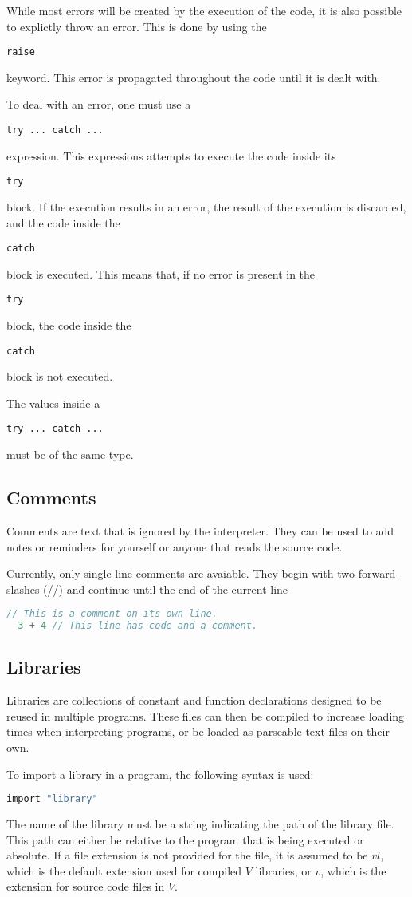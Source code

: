 \documentclass{article}
\def\code#1{\begin{footnotesize}\texttt{#1}\end{footnotesize}}
\begin{document}
While most errors will be created by the execution of the code, it is also possible to explictly throw an error.
This is done by using the \code{raise} keyword.
This error is propagated throughout the code until it is dealt with.

To deal with an error, one must use a \code{try ... catch ...} expression.
This expressions attempts to execute the code inside its \code{try} block.
If the execution results in an error, the result of the execution is discarded, and the code inside the \code{catch} block is executed.
This means that, if no error is present in the \code{try} block, the code inside the \code{catch} block is not executed.

The values inside a \code{try ... catch ...} must be of the same type.

\subsection{Comments}
Comments are text that is ignored by the interpreter.
They can be used to add notes or reminders for yourself or anyone that reads the source code.

Currently, only single line comments are avaiable.
They begin with two forward-slashes (//) and continue until the end of the current line

\begin{lstlisting}[language=V]
  // This is a comment on its own line.
  3 + 4 // This line has code and a comment.
\end{lstlisting}

\subsection{Libraries}

Libraries are collections of constant and function declarations designed to be reused in multiple programs.
These files can then be compiled to increase loading times when interpreting programs, or be loaded as parseable text files on their own.

To import a library in a program, the following syntax is used:

\begin{lstlisting}[language=V]
  import "library"
\end{lstlisting}

The name of the library must be a string indicating the path of the library file.
This path can either be relative to the program that is being executed or absolute.
If a file extension is not provided for the file, it is assumed to be $vl$, which is the default extension used for compiled $V$ libraries, or $v$, which is  the extension for source code files in $V$.
\end{document}
